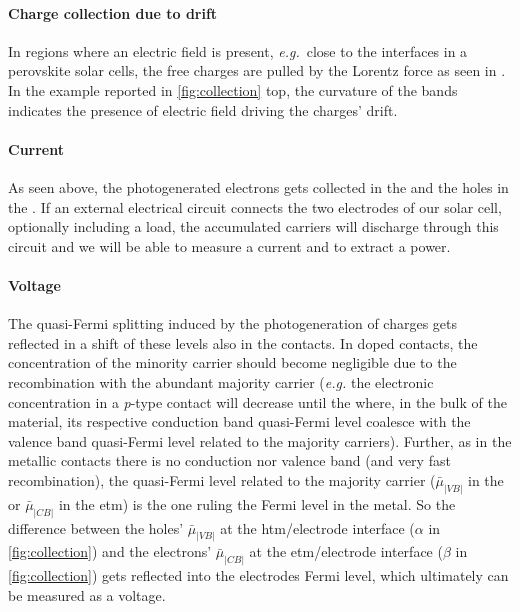 		\paragraph{Charge collection due to drift}
		In regions where an electric field is present, \textsl{e.g.}\ close to the interfaces in a perovskite solar cells, the free charges are pulled by the Lorentz force as seen in .
		In the example reported in \cref{fig:collection} top, the curvature of the bands indicates the presence of electric field driving the charges' drift.

		\paragraph{Current}
		As seen above, the photogenerated electrons gets collected in the  and the holes in the .
		If an external electrical circuit connects the two electrodes of our solar cell, optionally including a load, the accumulated carriers will discharge through this circuit and we will be able to measure a current and to extract a power.
		
		\paragraph{Voltage}
		The quasi-Fermi splitting induced by the photogeneration of charges gets reflected in a shift of these levels also in the contacts.
		In doped contacts, the concentration of the minority carrier should become negligible due to the recombination with the abundant majority carrier (\textsl{e.g.} the electronic concentration in a \textit{p}-type contact will decrease until the where, in the bulk of the material, its respective conduction band quasi-Fermi level coalesce with the valence band quasi-Fermi level related to the majority carriers).
		Further, as in the metallic contacts there is no conduction nor valence band (and very fast recombination), the quasi\hyp{}Fermi level related to the majority carrier ($\bar\mu_|VB|$ in the  or $\bar\mu_|CB|$ in the \gls{etm}) is the one ruling the Fermi level in the metal.
		So the difference between the holes' $\bar\mu_|VB|$ at the \gls{htm}/electrode interface ($\alpha$ in \cref{fig:collection}) and the electrons' $\bar\mu_|CB|$ at the \gls{etm}/electrode interface ($\beta$ in \cref{fig:collection}) gets reflected into the electrodes Fermi level, which ultimately can be measured as a voltage.
			 

